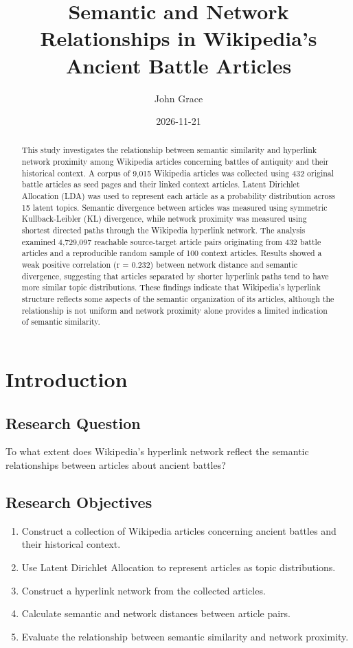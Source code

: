 \documentclass[
  letterpaper,
  DIV=11,
  numbers=noendperiod]{scrartcl}
\title{Semantic and Network Relationships in Wikipedia's Ancient Battle
Articles}
\author{John Grace}
\date{2026-11-21}
\providecommand{\tightlist}{%
  \setlength{\itemsep}{0pt}\setlength{\parskip}{0pt}}\usepackage{longtable,booktabs,array}
\begin{document}
\maketitle
\begin{abstract}
This study investigates the relationship between semantic similarity and
hyperlink network proximity among Wikipedia articles concerning battles
of antiquity and their historical context. A corpus of 9,015 Wikipedia
articles was collected using 432 original battle articles as seed pages
and their linked context articles. Latent Dirichlet Allocation (LDA) was
used to represent each article as a probability distribution across 15
latent topics. Semantic divergence between articles was measured using
symmetric Kullback-Leibler (KL) divergence, while network proximity was
measured using shortest directed paths through the Wikipedia hyperlink
network. The analysis examined 4,729,097 reachable source-target article
pairs originating from 432 battle articles and a reproducible random
sample of 100 context articles. Results showed a weak positive
correlation (r = 0.232) between network distance and semantic
divergence, suggesting that articles separated by shorter hyperlink
paths tend to have more similar topic distributions. These findings
indicate that Wikipedia's hyperlink structure reflects some aspects of
the semantic organization of its articles, although the relationship is
not uniform and network proximity alone provides a limited indication of
semantic similarity.
\end{abstract}


\section{Introduction}\label{introduction}

\subsection{Research Question}\label{research-question}

To what extent does Wikipedia's hyperlink network reflect the semantic
relationships between articles about ancient battles?

\subsection{Research Objectives}\label{research-objectives}

\begin{enumerate}
\def\labelenumi{\arabic{enumi}.}
\tightlist
\item
  Construct a collection of Wikipedia articles concerning ancient
  battles and their historical context.
\item
  Use Latent Dirichlet Allocation to represent articles as topic
  distributions.
\item
  Construct a hyperlink network from the collected articles.
\item
  Calculate semantic and network distances between article pairs.
\item
  Evaluate the relationship between semantic similarity and network
  proximity.
\end{enumerate}
\end{document}
